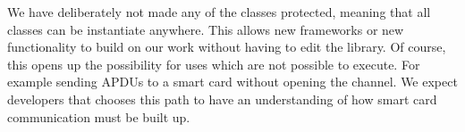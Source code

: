 We have deliberately not made any of the classes protected, meaning that all classes can be instantiate anywhere. This allows new frameworks or new functionality to build on our work without having to edit the library. Of course, this opens up the possibility for uses which are not possible to execute. For example sending APDUs to a smart card without opening the channel. We expect developers that chooses this path to have an understanding of how smart card communication must be built up.
